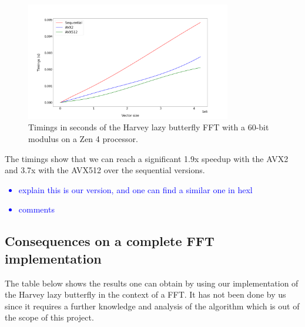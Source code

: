 \documentclass[a4paper]{article}
\begin{document}
\begin{figure}[h!]
    \begin{center}
        \includegraphics[width=0.8\textwidth]{lazy-butterfly_argiope.png}
    \end{center}
    \caption{Timings in seconds of the Harvey lazy butterfly FFT with a 60-bit modulus on a Zen 4 processor.}
\end{figure}

The timings show that we can reach a significant 1.9x speedup with the AVX2 and 3.7x with the AVX512 over the
sequential versions.


\newpage
\textcolor{blue}{
    \begin{itemize}
        \item explain this is our version, and one can find a similar one in hexl
        \item  comments
    \end{itemize}
}

\subsection{Consequences on a complete FFT implementation}

The table below shows the results one can obtain by using our implementation of the Harvey lazy butterfly
in the context of a FFT.
It has not been done by us since it requires a further knowledge and analysis of the algorithm
which is out of the scope of this project.
\end{document}
